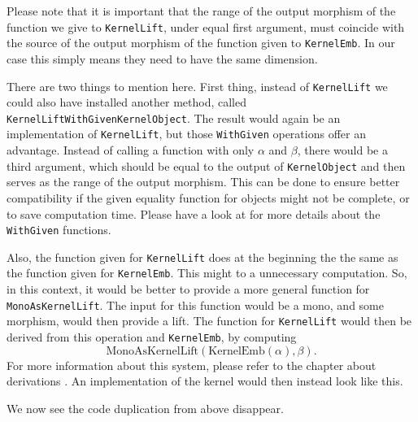 Please note that it is important that the range of the output morphism of the function we give to \texttt{KernelLift},
under equal first argument, must coincide with the source of the output morphism of the function given to \texttt{KernelEmb}.
In our case this simply means they need to have the same dimension.



There are two things to mention here.
First thing, instead of \texttt{KernelLift} we could also have installed another method,
called \texttt{KernelLiftWithGivenKernelObject}. The result would again be an implementation of \texttt{KernelLift}, but those
\texttt{WithGiven} operations  offer an advantage. Instead of calling a function with only $\alpha$ and $\beta$, there
would be a third argument, which should be equal to the output of \texttt{KernelObject} and then serves as the range of the output morphism.
This can be done to ensure better compatibility if the given equality function for objects might not be complete, or to save computation time.
Please have a look at  for more details about the \texttt{WithGiven} functions.

Also, the function given for \texttt{KernelLift} does at the beginning the the same as the function given for \texttt{KernelEmb}. This might to
a unnecessary computation. So, in this context, it would be better to provide a more general function for \texttt{MonoAsKernelLift}.
The input for this function would be a mono, and some morphism, would then provide a lift. The function for \texttt{KernelLift} would then be derived
from this operation and \texttt{KernelEmb}, by computing
\[
 \mathrm{MonoAsKernelLift} \left( \mathrm{KernelEmb} \left( \alpha \right), \beta \right).
\]
For more information about this system, please refer to the chapter about derivations .
An implementation of the kernel would then instead look like this.



We now see the code duplication from above disappear.


